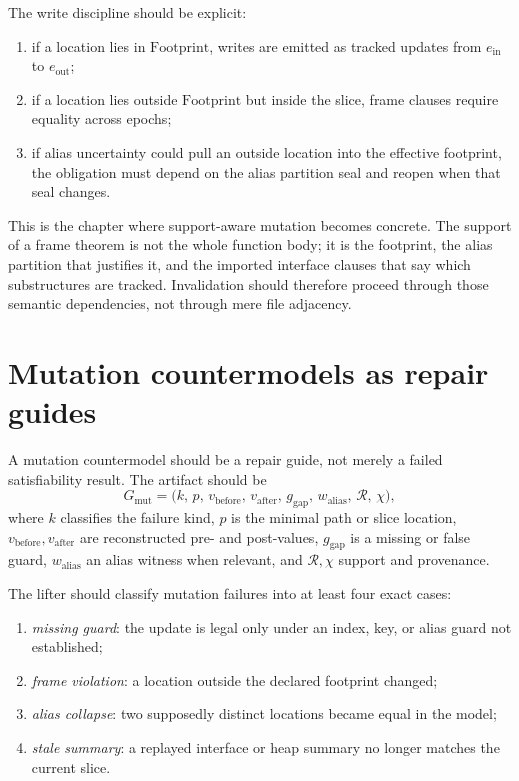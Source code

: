 \documentclass[11pt]{report}
\begin{document}
The write discipline should be explicit:
\begin{enumerate}
\item if a location lies in $\mathrm{Footprint}$, writes are emitted as tracked updates from $e_{\mathrm{in}}$ to $e_{\mathrm{out}}$;
\item if a location lies outside $\mathrm{Footprint}$ but inside the slice, frame clauses require equality across epochs;
\item if alias uncertainty could pull an outside location into the effective footprint, the obligation must depend on the alias partition seal and reopen when that seal changes.
\end{enumerate}

This is the chapter where support-aware mutation becomes concrete. The support of a frame theorem is not the whole function body; it is the footprint, the alias partition that justifies it, and the imported interface clauses that say which substructures are tracked. Invalidation should therefore proceed through those semantic dependencies, not through mere file adjacency.
\section{Mutation countermodels as repair guides}
A mutation countermodel should be a repair guide, not merely a failed satisfiability result. The artifact should be
\[
G_{\mathrm{mut}}
=
\bigl(
k,\,
p,\,
v_{\mathrm{before}},\,
v_{\mathrm{after}},\,
g_{\mathrm{gap}},\,
w_{\mathrm{alias}},\,
\mathcal{R},\,
\chi
\bigr),
\]
where $k$ classifies the failure kind, $p$ is the minimal path or slice location, $v_{\mathrm{before}},v_{\mathrm{after}}$ are reconstructed pre- and post-values, $g_{\mathrm{gap}}$ is a missing or false guard, $w_{\mathrm{alias}}$ an alias witness when relevant, and $\mathcal{R},\chi$ support and provenance.

The lifter should classify mutation failures into at least four exact cases:
\begin{enumerate}
\item \emph{missing guard}: the update is legal only under an index, key, or alias guard not established;
\item \emph{frame violation}: a location outside the declared footprint changed;
\item \emph{alias collapse}: two supposedly distinct locations became equal in the model;
\item \emph{stale summary}: a replayed interface or heap summary no longer matches the current slice.
\end{enumerate}
\end{document}

